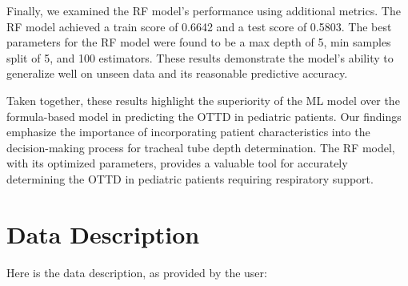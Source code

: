 \documentclass[11pt]{article}
\begin{document}
Finally, we examined the RF model's performance using additional metrics. The RF model achieved a train score of 0.6642 and a test score of 0.5803. The best parameters for the RF model were found to be a max depth of 5, min samples split of 5, and 100 estimators. These results demonstrate the model's ability to generalize well on unseen data and its reasonable predictive accuracy.

Taken together, these results highlight the superiority of the ML model over the formula-based model in predicting the OTTD in pediatric patients. Our findings emphasize the importance of incorporating patient characteristics into the decision-making process for tracheal tube depth determination. The RF model, with its optimized parameters, provides a valuable tool for accurately determining the OTTD in pediatric patients requiring respiratory support.


\clearpage
\appendix

\section{Data Description} \label{sec:data_description} Here is the data description, as provided by the user:
\end{document}
